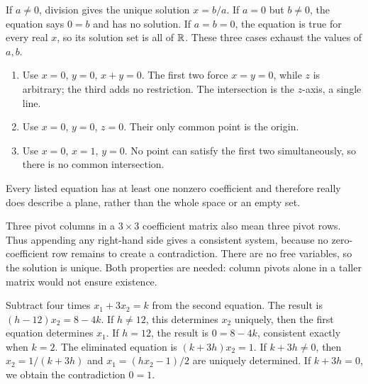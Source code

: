 If $a\ne0$, division gives the unique solution $x=b/a$.
If $a=0$ but $b\ne0$, the equation says $0=b$ and has no solution.
If $a=b=0$, the equation is true for every real $x$, so its solution
set is all of $\mathbb{R}$. These three cases exhaust the values of $a,b$.

\begin{enumerate}[label=(\alph*)]
\item Use $x=0$, $y=0$, $x+y=0$. The first two force $x=y=0$,
while $z$ is arbitrary; the third adds no restriction. The intersection
is the $z$-axis, a single line.
\item Use $x=0$, $y=0$, $z=0$. Their only common point is the origin.
\item Use $x=0$, $x=1$, $y=0$. No point can satisfy the first two
simultaneously, so there is no common intersection.
\end{enumerate}
Every listed equation has at least one nonzero coefficient and therefore
really does describe a plane, rather than the whole space or an empty set.

Three pivot columns in a $3\times3$ coefficient matrix also mean
three pivot rows. Thus appending any right-hand side gives a consistent
system, because no zero-coefficient row remains to create a contradiction.
There are no free variables, so the solution is unique. Both properties
are needed: column pivots alone in a taller matrix would not ensure existence.

Subtract four times $x_1+3x_2=k$ from the second equation. The
result is $(h-12)x_2=8-4k$. If $h\ne12$, this determines $x_2$
uniquely, then the first equation determines $x_1$. If $h=12$,
the result is $0=8-4k$, consistent exactly when $k=2$.
The eliminated equation is $(k+3h)x_2=1$.
If $k+3h\ne0$, then $x_2=1/(k+3h)$ and
$x_1=(hx_2-1)/2$ are uniquely determined. If $k+3h=0$,
we obtain the contradiction $0=1$.

